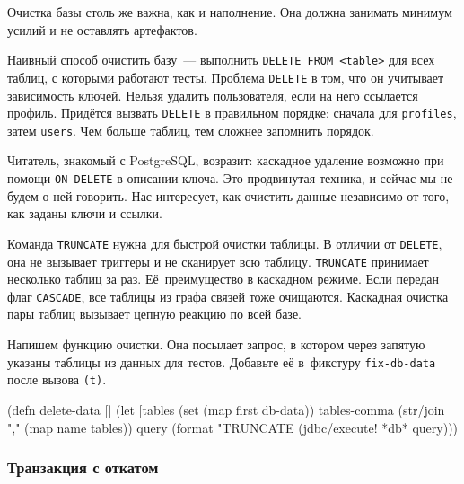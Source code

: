 
Очистка базы столь же важна, как и наполнение. Она должна занимать минимум
усилий и не оставлять артефактов.

Наивный способ очистить базу~--- выполнить \verb|DELETE FROM <table>| для всех
таблиц, с которыми работают тесты. Проблема \verb|DELETE| в том, что он
учитывает зависимость ключей. Нельзя удалить пользователя, если на него
ссылается профиль. Придётся вызвать \verb|DELETE| в правильном порядке:
сначала для \verb|profiles|, затем \verb|users|. Чем больше таблиц, тем
сложнее запомнить порядок.


Читатель, знакомый с PostgreSQL, возразит: каскадное удаление возможно при
помощи \verb|ON DELETE| в описании ключа. Это продвинутая техника, и сейчас
мы не будем о ней говорить. Нас интересует, как очистить данные независимо от
того, как заданы ключи и ссылки.


Команда \verb|TRUNCATE|  нужна для быстрой очистки таблицы. В
отличии от \verb|DELETE|, она не вызывает триггеры и не сканирует всю
таблицу. \verb|TRUNCATE| принимает несколько таблиц за раз. Её~преимущество в
каскадном режиме. Если передан флаг \verb|CASCADE|, все таблицы из графа связей
тоже очищаются. Каскадная очистка пары таблиц вызывает цепную реакцию по всей
базе.


Напишем функцию очистки. Она посылает запрос, в котором через запятую указаны
таблицы из данных для тестов. Добавьте её в~фикстуру \verb|fix-db-data| после
вызова \verb|(t)|.

\begin{english}
  \begin{clojure}
(defn delete-data []
  (let [tables (set (map first db-data))
        tables-comma (str/join "," (map name tables))
        query (format "TRUNCATE %
    (jdbc/execute! *db* query)))
  \end{clojure}
\end{english}

\subsubsection*{Транзакция с откатом}


